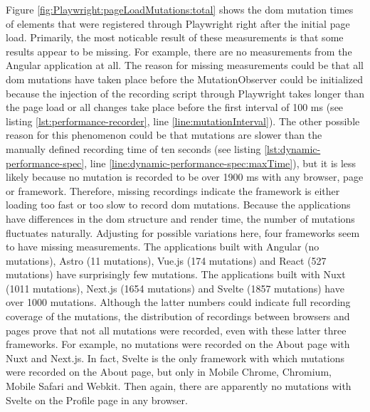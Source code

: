 \documentclass[a4paper, 12pt]{article}
\begin{document}
Figure \ref{fig:Playwright:pageLoadMutations:total} shows the \acrshort{dom} mutation times of elements that were registered through Playwright right after the initial page load.
Primarily, the most noticable result of these measurements is that some results appear to be missing.
For example, there are no measurements from the Angular application at all.
The reason for missing measurements could be that all \acrshort{dom} mutations have taken place before the MutationObserver could be initialized because the injection of the recording script through Playwright takes longer than the page load or all changes take place before the first interval of 100 ms (see listing \ref{lst:performance-recorder}, line \ref{line:mutationInterval}).
The other possible reason for this phenomenon could be that mutations are slower than the manually defined recording time of ten seconds (see listing \ref{lst:dynamic-performance-spec}, line \ref{line:dynamic-performance-spec:maxTime}), but it is less likely because no mutation is recorded to be over 1900 ms with any browser, page or framework.
Therefore, missing recordings indicate the framework is either loading too fast or too slow to record \acrshort{dom} mutations.
Because the applications have differences in the \acrshort{dom} structure and render time, the number of mutations fluctuates naturally.
Adjusting for possible variations here, four frameworks seem to have missing measurements.
The applications built with Angular (no mutations), Astro (11 mutations), Vue.js (174 mutations) and React (527 mutations) have surprisingly few mutations.
The applications built with Nuxt (1011 mutations), Next.js (1654 mutations) and Svelte (1857 mutations) have over 1000 mutations.
Although the latter numbers could indicate full recording coverage of the mutations, the distribution of recordings between browsers and pages prove that not all mutations were recorded, even with these latter three frameworks.
For example, no mutations were recorded on the About page with Nuxt and Next.js.
In fact, Svelte is the only framework with which mutations were recorded on the About page, but only in Mobile Chrome, Chromium, Mobile Safari and Webkit.
Then again, there are apparently no mutations with Svelte on the Profile page in any browser.
\end{document}
